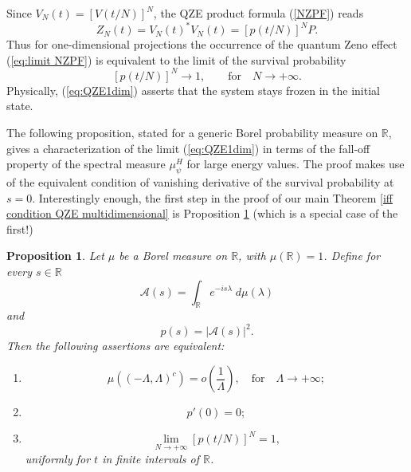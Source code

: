 \documentclass[aip,jmp,12pt
]{revtex4}
\newcommand{\RM}{\mathbb{R}}
\newtheorem{proposition}{Proposition}
\theoremstyle{definition}
\begin{document}
Since $V_{N}(t)=[V(t/N)]^N$,
the QZE product formula (\ref{NZPF}) reads
\begin{equation*}
Z_N(t)= V_{N}(t)^{*}V_{N}(t)= [p(t/N)]^N P.
\end{equation*}
Thus for one-dimensional projections the occurrence of the  quantum Zeno effect (\ref{eq:limit NZPF}) is equivalent to the limit of the survival probability
\begin{equation}
\label{eq:QZE1dim}
[p(t/N)]^N \to 1, \qquad \text{for} \quad N \to +\infty.
\end{equation}
Physically, (\ref{eq:QZE1dim}) asserts that the system stays frozen in the initial state.

The following proposition, stated for a generic Borel probability measure on $\RM$, gives a characterization of the limit (\ref{eq:QZE1dim}) in terms of the fall-off property of the spectral measure $\mu_{\psi}^H$ for large energy values. The proof makes use of the equivalent condition of vanishing derivative of the survival probability at $s=0$.
Interestingly enough, the first step in the proof of our main Theorem \ref{iff condition QZE multidimensional} is Proposition \ref{iff condition QZE} (which is a special case of the first!)

\begin{proposition}\label{iff condition QZE}
Let $\mu$ be a Borel measure on   $\RM$, with $\mu(\RM)=1$. Define for every $s \in \RM$
\begin{equation*}
\mathcal{A}(s)=\int_{\RM} e^{-is\lambda}\; d\mu(\lambda)
\end{equation*}
and
\begin{equation*}
p(s)=|\mathcal{A}(s)|^2.
\end{equation*}
Then the following assertions are equivalent:
\begin{enumerate}
    \item \label{fdtc 1D}
    \begin{equation*}
          \mu((-\Lambda,\Lambda)^c) =o\left( \frac{1}{\Lambda} \right), \quad \mathrm{for} \quad \Lambda \to + \infty;
    \end{equation*}
    \item
      \begin{equation*}
        p'(0)=0;
      \end{equation*}
    \item \label{prod. formula 1D}
    \begin{equation*}
      \lim_{N \to +\infty} [p(t/N)]^N=1,
    \end{equation*}
    uniformly for $t$ in finite intervals of $\RM$.
\end{enumerate}
\end{proposition}
\end{document}
